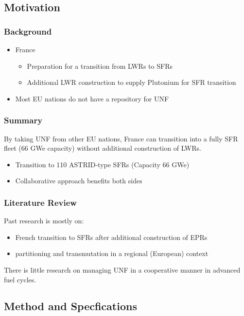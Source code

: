 \subsection{Motivation}
\begin{frame}
	\frametitle{Background}
	\begin{itemize}
		\item France 
		\begin{itemize}
			\item Preparation for a transition from \glspl{LWR} to \glspl{SFR} \cite{cne2_reports_2015}
			\item Additional \gls{LWR} construction to supply Plutonium for \gls{SFR} transition
		\end{itemize}
		\item Most EU nations do not have a repository for \gls{UNF}
	\end{itemize}
\end{frame}

\begin{frame}
	\frametitle{Summary}
	By taking \gls{UNF} from other EU nations, France can transition into a fully \gls{SFR} fleet (66 GWe capacity)
	without additional construction of \glspl{LWR}.
	\begin{itemize}
		\item Transition to 110 \gls{ASTRID}-type \glspl{SFR} (Capacity 66 GWe)
		\item Collaborative approach benefits both sides
	\end{itemize}
\end{frame}

\begin{frame}
	\frametitle{Literature Review}
	Past research is mostly on:
	\begin{itemize}
		\item French transition to \glspl{SFR} after additional construction of \glspl{EPR} 	
		\cite{carre_overview_2009, martin_symbiotic_2017, freynet_multiobjective_2016}
		\item partitioning and transmutation in a regional (European) context \cite{fazio_study_2013}
	\end{itemize}

	There is little research on managing \gls{UNF} in a cooperative manner in
	advanced fuel cycles.
\end{frame}

\subsection{Method and Specfications}


